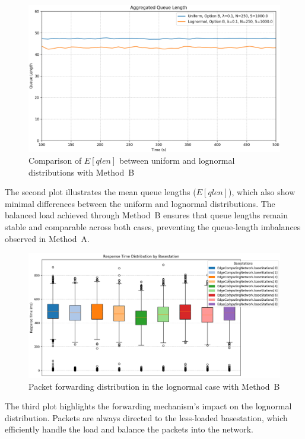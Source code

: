 \documentclass{report}
\begin{document}
\begin{figure}[H]
    \centering
    \includegraphics[width=\textwidth]{img/plots/I-vary/Q_B_I01.png}
    \caption{Comparison of $E[qlen]$ between uniform and lognormal distributions with Method~B}
\end{figure}

\begin{flushleft}
The second plot illustrates the mean queue lengths ($E[qlen]$), which also show minimal differences between the uniform and lognormal distributions. The balanced load achieved through Method~B ensures that queue lengths remain stable and comparable across both cases, preventing the queue-length imbalances observed in Method~A.
\end{flushleft}

\begin{figure}[H]
    \centering
    \includegraphics[width=\textwidth]{img/plots/I-vary/Q_Box_Log_B_I01.png}
    \caption{Packet forwarding distribution in the lognormal case with Method~B}
\end{figure}

\begin{flushleft}
The third plot highlights the forwarding mechanism's impact on the lognormal distribution. Packets are always directed to the less-loaded basestation, which efficiently handle the load and balance the packets into the network.
\end{flushleft}
\end{document}
